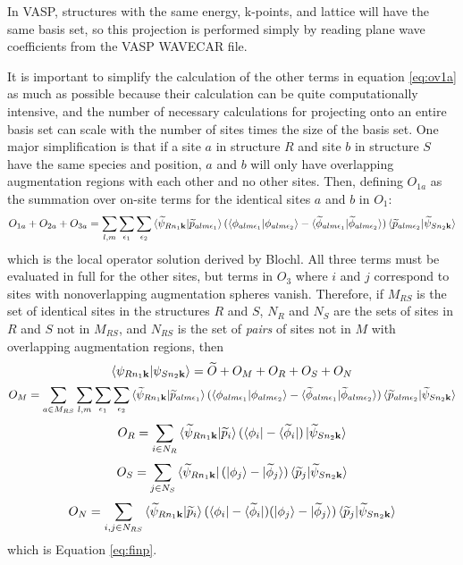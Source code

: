 \documentclass[12pt]{article}
\begin{document}
In VASP, structures with the same energy, k-points, and lattice will have the same basis set,
so this projection is performed simply by reading plane wave coefficients from the VASP WAVECAR file.

It is important to simplify the calculation of the other terms in equation \ref{eq:ov1a} as much
as possible because their calculation can be quite computationally intensive, and the number of
necessary calculations for projecting onto an entire basis set can scale with the number
of sites times the size of the basis set. One major simplification is that if a site $a$ in structure
$R$ and site $b$ in structure $S$ have the same species and position, $a$ and $b$ will only have
overlapping augmentation regions with each other and no other sites. Then, defining $O_{1a}$
as the summation over on-site terms for the identical sites $a$ and $b$ in $O_1$:
$$O_{1a}+O_{2a}+O_{3a}=\sum_{l,m}\sum_{\epsilon_1}\sum_{\epsilon_2}
\braket{\widetilde{\psi}_{Rn_1\mathbf{k}}|\widetilde{p}_{alm\epsilon _1}}
(\braket{\phi_{alm\epsilon _1}|{\phi_{alm\epsilon _2}}}
-\braket{\widetilde{\phi}_{alm\epsilon _1}|\widetilde{\phi}_{alm\epsilon _2}})
\braket{\widetilde{p}_{alm\epsilon _2}|\widetilde{\psi}_{Sn_2\mathbf{k}}}$$
which is the local operator solution derived by Blochl. All three terms must
be evaluated in full for the other sites, but terms in $O_3$ where $i$ and $j$ correspond
to sites with nonoverlapping augmentation spheres vanish. Therefore, if $M_{RS}$ is the set
of identical sites in the structures $R$ and $S$, $N_R$ and $N_S$ are the sets of sites
in $R$ and $S$ not in $M_{RS}$, and $N_{RS}$ is the set of \emph{pairs} of sites not in
$M$ with overlapping augmentation regions, then
$$
\braket{\psi_{Rn_1\mathbf{k}}|\psi_{Sn_2\mathbf{k}}}=\widetilde{O}+O_M+O_R+O_S+O_N
$$
$$
O_M=\sum_{a\in M_{RS}}\sum_{l,m}\sum_{\epsilon_1}\sum_{\epsilon_2}
\braket{\widetilde{\psi}_{Rn_1\mathbf{k}}|\widetilde{p}_{alm\epsilon _1}}
(\braket{\phi_{alm\epsilon _1}|{\phi_{alm\epsilon _2}}}
-\braket{\widetilde{\phi}_{alm\epsilon _1}|\widetilde{\phi}_{alm\epsilon _2}})
\braket{\widetilde{p}_{alm\epsilon _2}|\widetilde{\psi}_{Sn_2\mathbf{k}}}
$$
$$
O_R=\sum_{i\in N_R}\braket{\widetilde{\psi}_{Rn_1\mathbf{k}}|\widetilde{p}_i}
(\bra{\phi_i}-\bra{\widetilde{\phi}_i})
\ket{\widetilde{\psi}_{Sn_2\mathbf{k}}}
$$
$$
O_S=\sum_{j\in N_S}\bra{\widetilde{\psi}_{Rn_1\mathbf{k}}}(\ket{\phi_j}-\ket{\widetilde{\phi}_j})
\braket{\widetilde{p}_j|\widetilde{\psi}_{Sn_2\mathbf{k}}}
$$
$$
O_N=\sum_{i,j\in N_{RS}}\braket{\widetilde{\psi}_{Rn_1\mathbf{k}}|
\widetilde{p}_i}(\bra{\phi_i}-\bra{\widetilde{\phi}_i})
(\ket{\phi_j}-\ket{\widetilde{\phi}_j})\braket{\widetilde{p}_j|\widetilde{\psi}_{Sn_2\mathbf{k}}}
$$
which is Equation \ref{eq:finp}.
\end{document}

